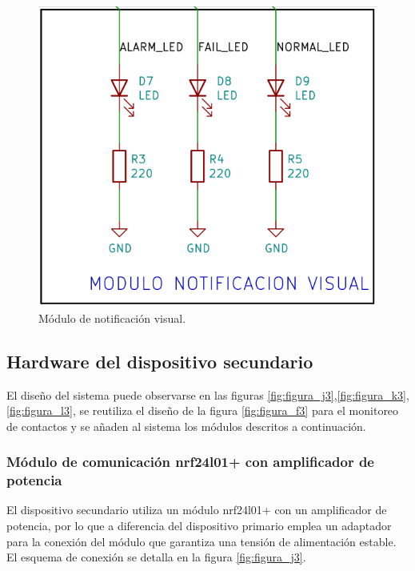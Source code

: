 \begin{figure}[]
	\centering
	\includegraphics[scale=.25]{./Figures/Capitulo3/Fig_H3.png}
	\caption{Módulo de notificación visual.}
	\label{fig:figura_h3}
\end{figure} 


\subsection{Hardware del dispositivo secundario}

El diseño del sistema puede observarse en las figuras \ref{fig:figura_j3},\ref{fig:figura_k3},\ref{fig:figura_l3}, se reutiliza el diseño de la figura \ref{fig:figura_f3} para el monitoreo de contactos y se añaden al sistema los módulos descritos a continuación.

\subsubsection{Módulo de comunicación nrf24l01+ con amplificador de potencia}

El dispositivo secundario utiliza un módulo nrf24l01+ con un amplificador de potencia, por lo que a diferencia del dispositivo primario emplea un adaptador para la conexión del módulo que garantiza una tensión de alimentación estable. El esquema de conexión se detalla en la figura \ref{fig:figura_j3}.

